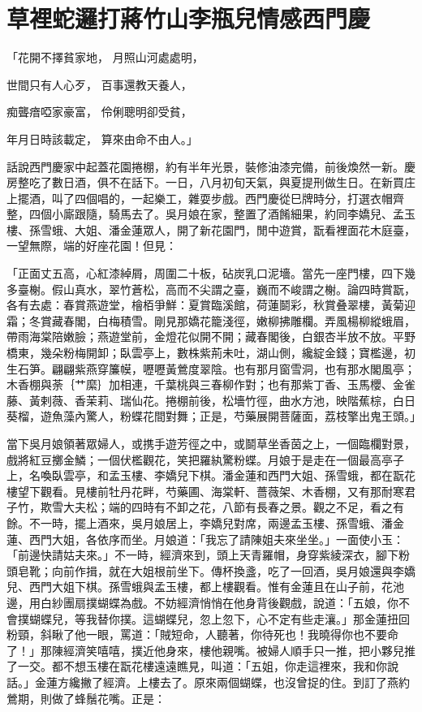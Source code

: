 %

\chapter{草裡蛇邏打蔣竹山\KG 李瓶兒情感西門慶}

「花開不擇貧家地，  月照山河處處明，

世間只有人心歹，  百事還教天養人，

痴聾瘖啞家豪富，  伶俐聰明卻受貧，

年月日時該載定，  算來由命不由人。」

話說西門慶家中起蓋花園捲棚，約有半年光景，裝修油漆完備，前後煥然一新。慶房整吃了數日酒，俱不在話下。一日，八月初旬天氣，與夏提刑做生日。在新買庄上擺酒，叫了四個唱的，一起樂工，雜耍步戲。西門慶從巳牌時分，打選衣帽齊整，四個小廝跟隨，騎馬去了。吳月娘在家，整置了酒餚細果，約同李嬌兒、孟玉樓、孫雪蛾、大姐、潘金蓮眾人，開了新花園門，閒中遊賞，翫看裡面花木庭臺，一望無際，端的好座花園！但見：

「正面丈五高，心紅漆綽屑，周圍二十板，砧炭乳口泥墻。當先一座門樓，四下幾多臺榭。假山真水，翠竹蒼松，高而不尖謂之臺，巍而不峻謂之榭。論四時賞翫，各有去處：春賞燕遊堂，檜栢爭鮮：夏賞臨溪館，荷蓮鬬彩，秋賞叠翠樓，黃菊迎霜；冬賞藏春閣，白梅積雪。剛見那嬌花籠淺徑，嫩柳拂雕欄。弄風楊柳縱蛾眉，帶雨海棠陪嫩臉；燕遊堂前，金燈花似開不開；藏春閣後，白銀杏半放不放。平野橋東，幾朵粉梅開卸；臥雲亭上，數株紫荊未吐，湖山側，纔綻金錢；寶檻邊，初生石笋。翩翩紫燕穿簾幙，嚦嚦黃鶯度翠陰。也有那月窗雪洞，也有那水閣風亭；木香棚與荼｛艹縻｝加相連，千葉桃與三春柳作對；也有那紫丁香、玉馬櫻、金雀藤、黃剌薇、香茉莉、瑞仙花。捲棚前後，松墻竹徑，曲水方池，映階蕉棕，白日葵榴，遊魚藻內驚人，粉蝶花間對舞；正是，芍藥展開菩薩面，荔枝擎出鬼王頭。」

當下吳月娘領著眾婦人，或携手遊芳徑之中，或鬬草坐香茵之上，一個臨欄對景，戲將紅豆擲金鱗；一個伏檻觀花，笑把羅紈驚粉蝶。月娘于是走在一個最高亭子上，名喚臥雲亭，和孟玉樓、李嬌兒下棋。潘金蓮和西門大姐、孫雪蛾，都在翫花樓望下觀看。見樓前牡丹花畔，芍藥圃、海棠軒、薔薇架、木香棚，又有那耐寒君子竹，欺雪大夫松；端的四時有不卸之花，八節有長春之景。觀之不足，看之有餘。不一時，擺上酒來，吳月娘居上，李嬌兒對席，兩邊孟玉樓、孫雪蛾、潘金蓮、西門大姐，各依序而坐。月娘道：「我忘了請陳姐夫來坐坐。」一面使小玉：「前邊快請姑夫來。」不一時，經濟來到，頭上天青羅帽，身穿紫綾深衣，腳下粉頭皂靴；向前作揖，就在大姐根前坐下。傳杯換盞，吃了一回酒，吳月娘還與李嬌兒、西門大姐下棋。孫雪蛾與孟玉樓，都上樓觀看。惟有金蓮且在山子前，花池邊，用白紗團扇撲蝴蝶為戲。不妨經濟悄悄在他身背後觀戲，說道：「五娘，你不會撲蝴蝶兒，等我替你撲。這蝴蝶兒，忽上忽下，心不定有些走瀼。」那金蓮扭回粉頸，斜瞅了他一眼，罵道：「賊短命，人聽著，你待死也！我曉得你也不要命了！」那陳經濟笑嘻嘻，撲近他身來，樓他親嘴。被婦人順手只一推，把小夥兒推了一交。都不想玉樓在翫花樓遠遠瞧見，叫道：「五姐，你走這裡來，我和你說話。」金蓮方纔撇了經濟。上樓去了。原來兩個蝴蝶，也沒曾捉的住。到訂了燕約鶯期，則做了蜂鬚花嘴。正是：

